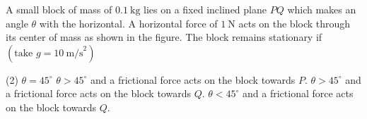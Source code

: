 
\item A small block of mass of \(0.1~\text{kg}\) lies on a fixed inclined plane \(PQ\) which makes an angle \(\theta\) with the horizontal. A horizontal force of \(1~\text{N}\) acts on the block through its center of mass as shown in the figure. The block remains stationary if \((\text{take } g = 10~\text{m/s}^2)\)
    \begin{center}
    \end{center}
    \begin{tasks}(2)
        \task \(\theta = 45^\circ\)
        \task \(\theta > 45^\circ\) and a frictional force acts on the block towards \(P\).
        \task \(\theta > 45^\circ\) and a frictional force acts on the block towards \(Q\).
        \task \(\theta < 45^\circ\) and a frictional force acts on the block towards \(Q\).
    \end{tasks}
